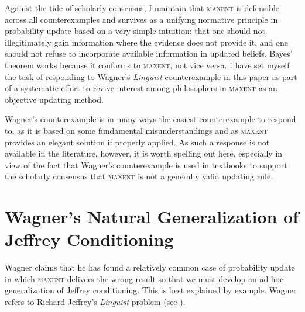 \documentclass[11pt]{article}
\begin{document}
Against the tide of scholarly consensus, I maintain that
\textsc{maxent} is defensible across all counterexamples and survives
as a unifying normative principle in probability update based on a
very simple intuition: that one should not illegitimately gain
information where the evidence does not provide it, and one should not
refuse to incorporate available information in updated beliefs. Bayes'
theorem works because it conforms to \textsc{maxent}, not vice versa.
I have set myself the task of responding to Wagner's
\emph{Linguist} counterexample in this paper as part of a
systematic effort to revive interest among philosophers in
\textsc{maxent} as an objective updating method.

Wagner's counterexample is in many ways the easiest counterexample to
respond to, as it is based on some fundamental misunderstandings and
as \textsc{maxent} provides an elegant solution if
properly applied. As such a response is not available in the
literature, however, it is worth spelling out here, especially in view
of the fact that Wagner's counterexample is used in textbooks to
support the scholarly consensus that \textsc{maxent}
is not a generally valid updating rule.

\section{Wagner's Natural Generalization of Jeffrey Conditioning}
\label{NatGen}

Wagner claims that he has found a relatively common case of
probability update in which \textsc{maxent} delivers the wrong result
so that we must develop an ad hoc generalization of Jeffrey
conditioning. This is best explained by example. Wagner refers to
Richard Jeffrey's \emph{Linguist} problem (see
).

\end{document}
